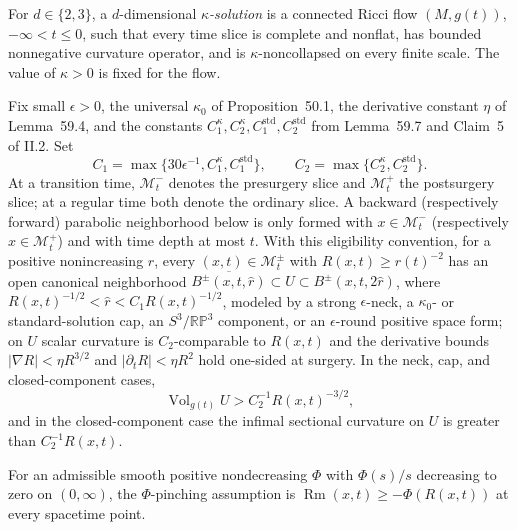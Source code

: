 \begin{definition}
\label{def:kappa-solution}
\notready
For $d\in\{2,3\}$, a $d$-dimensional \emph{$\kappa$-solution} is a connected Ricci flow
$(M,g(t))$, $-\infty<t\le0$, such that every time slice is complete and
nonflat, has bounded nonnegative curvature operator, and is
$\kappa$-noncollapsed on every finite scale.  The value of $\kappa>0$ is
fixed for the flow.
\end{definition}

\begin{definition}
\label{def:ricci-flow-surgery-canonical-neighborhood-assumption}
\notready
Fix small $\epsilon>0$, the universal $\kappa_0$ of Proposition~50.1, the
derivative constant $\eta$ of Lemma~59.4, and the constants
$C_1^\kappa,C_2^\kappa,C_1^{\mathrm{std}},C_2^{\mathrm{std}}$ from
Lemma~59.7 and Claim~5 of II.2.  Set
\[
 C_1=\max\{30\epsilon^{-1},C_1^\kappa,C_1^{\mathrm{std}}\},\qquad
C_2=\max\{C_2^\kappa,C_2^{\mathrm{std}}\}.
\]
At a transition time, $\mathcal M_t^-$ denotes the presurgery slice and
$\mathcal M_t^+$ the postsurgery slice; at a regular time both denote the
ordinary slice.  A backward (respectively forward) parabolic neighborhood
below is only formed with $x\in\mathcal M_t^-$ (respectively
$x\in\mathcal M_t^+$) and with time depth at most $t$.  With this eligibility
convention, for a positive nonincreasing $r$, every
$(x,t)\in\mathcal M_t^\pm$ with
$R(x,t)\ge r(t)^{-2}$ has an open canonical neighborhood
$\overline{B^\pm(x,t,\widehat r)}\subset U\subset B^\pm(x,t,2\widehat r)$,
where $R(x,t)^{-1/2}<\widehat r<C_1R(x,t)^{-1/2}$, modeled by a strong
$\epsilon$-neck, a $\kappa_0$- or standard-solution cap, an $S^3/\mathbb{RP}^3$
component, or an $\epsilon$-round positive space form; on $U$ scalar curvature
is $C_2$-comparable to $R(x,t)$ and the derivative bounds
$|\nabla R|<\eta R^{3/2}$ and $|\partial_tR|<\eta R^2$ hold one-sided at surgery.
In the neck, cap, and closed-component cases,
\[
 \operatorname{Vol}_{g(t)}U>C_2^{-1}R(x,t)^{-3/2},
\]
and in the closed-component case the infimal sectional curvature on $U$ is
greater than $C_2^{-1}R(x,t)$.
\end{definition}

\begin{definition}
\label{def:ricci-flow-surgery-phi-pinching}
\notready
For an admissible smooth positive nondecreasing $\Phi$ with $\Phi(s)/s$ decreasing
to zero on $(0,\infty)$, the $\Phi$-pinching assumption is
$\operatorname{Rm}(x,t)\ge-\Phi(R(x,t))$ at every spacetime point.
\end{definition}

